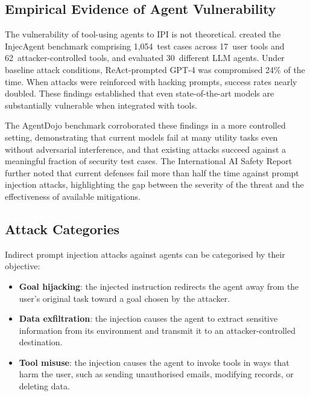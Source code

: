 \subsection{Empirical Evidence of Agent Vulnerability}

\begin{justify}
The vulnerability of tool-using agents to IPI is not theoretical.  \cite{zhan2024injecagent} created the InjecAgent benchmark comprising 1,054~test cases across 17~user tools and 62~attacker-controlled tools, and evaluated 30~different LLM agents.  Under baseline attack conditions, ReAct-prompted GPT-4 was compromised 24\% of the time.  When attacks were reinforced with hacking prompts, success rates nearly doubled.  These findings established that even state-of-the-art models are substantially vulnerable when integrated with tools.
\end{justify}

\begin{justify}
The AgentDojo benchmark \citep{debenedetti2024agentdojo} corroborated these findings in a more controlled setting, demonstrating that current models fail at many utility tasks even without adversarial interference, and that existing attacks succeed against a meaningful fraction of security test cases.  The International AI Safety Report \citep{aisafety2025international} further noted that current defenses fail more than half the time against prompt injection attacks, highlighting the gap between the severity of the threat and the effectiveness of available mitigations.
\end{justify}

\subsection{Attack Categories}

\begin{justify}
Indirect prompt injection attacks against agents can be categorised by their objective:
\end{justify}

\begin{itemize}
  \item \textbf{Goal hijacking}: the injected instruction redirects the agent away from the user's original task toward a goal chosen by the attacker.
  \item \textbf{Data exfiltration}: the injection causes the agent to extract sensitive information from its environment and transmit it to an attacker-controlled destination.
  \item \textbf{Tool misuse}: the injection causes the agent to invoke tools in ways that harm the user, such as sending unauthorised emails, modifying records, or deleting data.
\end{itemize}

